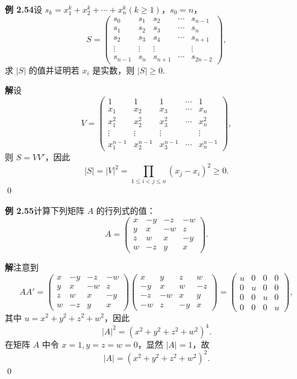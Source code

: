 \documentclass[UTF8, 12pt, fontset=fandol, oneside]{ctexart}
\begin{document}
\noindent\textbf{例 2.54}\quad 设 $s_k=x_1^k+x_2^k+\cdots+x_n^k(k\ge1)$，$s_0=n$，
\[
S=
\left(
\begin{array}{ccccc}
s_0 & s_1 & s_2 & \cdots & s_{n-1}\\
s_1 & s_2 & s_3 & \cdots & s_n\\
s_2 & s_3 & s_4 & \cdots & s_{n+1}\\
\vdots & \vdots & \vdots & & \vdots\\
s_{n-1} & s_n & s_{n+1} & \cdots & s_{2n-2}
\end{array}
\right),
\]
求 $|S|$ 的值并证明若 $x_i$ 是实数，则 $|S|\ge0$.

\noindent\textbf{解}\quad 设
\[
V=
\left(
\begin{array}{ccccc}
1 & 1 & 1 & \cdots & 1\\
x_1 & x_2 & x_3 & \cdots & x_n\\
x_1^2 & x_2^2 & x_3^2 & \cdots & x_n^2\\
\vdots & \vdots & \vdots & & \vdots\\
x_1^{n-1} & x_2^{n-1} & x_3^{n-1} & \cdots & x_n^{n-1}
\end{array}
\right),
\]
则 $S=VV'$，因此
\[
|S|=|V|^2=\prod_{1\le i<j\le n}(x_j-x_i)^2\ge0.
\]
\qed

\noindent\textbf{例 2.55}\quad 计算下列矩阵 $A$ 的行列式的值：
\[
A=
\left(
\begin{array}{rrrr}
x & -y & -z & -w\\
y & x & -w & z\\
z & w & x & -y\\
w & -z & y & x
\end{array}
\right).
\]

\noindent\textbf{解}\quad 注意到
\[
AA'=
\left(
\begin{array}{rrrr}
x & -y & -z & -w\\
y & x & -w & z\\
z & w & x & -y\\
w & -z & y & x
\end{array}
\right)
\left(
\begin{array}{rrrr}
x & y & z & w\\
-y & x & w & -z\\
-z & -w & x & y\\
-w & z & -y & x
\end{array}
\right)
=
\left(
\begin{array}{cccc}
u & 0 & 0 & 0\\
0 & u & 0 & 0\\
0 & 0 & u & 0\\
0 & 0 & 0 & u
\end{array}
\right),
\]
其中 $u=x^2+y^2+z^2+w^2$，因此
\[
|A|^2=(x^2+y^2+z^2+w^2)^4.
\]
在矩阵 $A$ 中令 $x=1,y=z=w=0$，显然 $|A|=1$，故
\[
|A|=(x^2+y^2+z^2+w^2)^2.
\]
\qed
\end{document}
